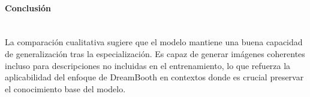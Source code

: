 \paragraph{\textbf{Conclusión}} \mbox{}\\[0.5em]
La comparación cualitativa sugiere que el modelo mantiene una buena capacidad de generalización tras la especialización. Es capaz de generar imágenes coherentes incluso para descripciones no incluidas en el entrenamiento, lo que refuerza la aplicabilidad del enfoque de DreamBooth en contextos donde es crucial preservar el conocimiento base del modelo.

